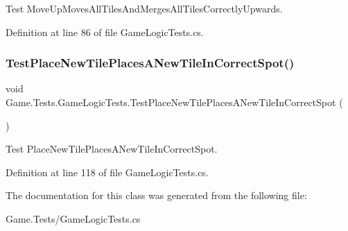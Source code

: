 Test Move\+Up\+Moves\+All\+Tiles\+And\+Merges\+All\+Tiles\+Correctly\+Upwards. 



Definition at line 86 of file Game\+Logic\+Tests.\+cs.

\mbox{\label{class_game_1_1_tests_1_1_game_logic_tests_a1ff4efb4b331cc873be402ad38ba07c9}} 
\subsubsection{\texorpdfstring{TestPlaceNewTilePlacesANewTileInCorrectSpot()}{TestPlaceNewTilePlacesANewTileInCorrectSpot()}}
{\footnotesize\ttfamily void Game.\+Tests.\+Game\+Logic\+Tests.\+Test\+Place\+New\+Tile\+Places\+A\+New\+Tile\+In\+Correct\+Spot (\begin{DoxyParamCaption}{ }\end{DoxyParamCaption})}



Test Place\+New\+Tile\+Places\+A\+New\+Tile\+In\+Correct\+Spot. 



Definition at line 118 of file Game\+Logic\+Tests.\+cs.



The documentation for this class was generated from the following file\+:\begin{DoxyCompactItemize}
\item 
Game.\+Tests/Game\+Logic\+Tests.\+cs\end{DoxyCompactItemize}
